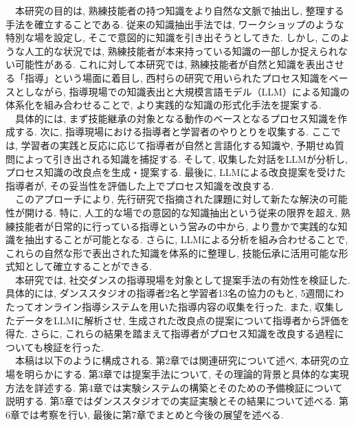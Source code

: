 　本研究の目的は, 熟練技能者の持つ知識をより自然な文脈で抽出し, 整理する手法を確立することである. 従来の知識抽出手法では, ワークショップのような特別な場を設定し, そこで意図的に知識を引き出そうとしてきた. しかし, このような人工的な状況では, 熟練技能者が本来持っている知識の一部しか捉えられない可能性がある. これに対して本研究では, 熟練技能者が自然と知識を表出させる「指導」という場面に着目し, 西村らの研究\cite{Nishimura2017}で用いられたプロセス知識をベースとしながら, 指導現場での知識表出と大規模言語モデル（LLM）による知識の体系化を組み合わせることで, より実践的な知識の形式化手法を提案する. \\
　具体的には, まず技能継承の対象となる動作のベースとなるプロセス知識を作成する. 次に, 指導現場における指導者と学習者のやりとりを収集する. ここでは, 学習者の実践と反応に応じて指導者が自然と言語化する知識や, 予期せぬ質問によって引き出される知識を捕捉する. そして, 収集した対話をLLMが分析し, プロセス知識の改良点を生成・提案する. 最後に, LLMによる改良提案を受けた指導者が, その妥当性を評価した上でプロセス知識を改良する. \\
　このアプローチにより, 先行研究で指摘された課題に対して新たな解決の可能性が開ける. 特に, 人工的な場での意図的な知識抽出という従来の限界を超え, 熟練技能者が日常的に行っている指導という営みの中から, より豊かで実践的な知識を抽出することが可能となる. さらに, LLMによる分析を組み合わせることで, これらの自然な形で表出された知識を体系的に整理し, 技能伝承に活用可能な形式知として確立することができる. \\
　本研究では, 社交ダンスの指導現場を対象として提案手法の有効性を検証した. 具体的には, ダンススタジオの指導者2名と学習者13名の協力のもと, 5週間にわたってオンライン指導システムを用いた指導内容の収集を行った. また, 収集したデータをLLMに解析させ, 生成された改良点の提案について指導者から評価を得た. さらに, これらの結果を踏まえて指導者がプロセス知識を改良する過程についても検証を行った.\\
　本稿は以下のように構成される. 第2章では関連研究について述べ, 本研究の立場を明らかにする. 第3章では提案手法について, その理論的背景と具体的な実現方法を詳述する. 第4章では実験システムの構築とそのための予備検証について説明する. 第5章ではダンススタジオでの実証実験とその結果について述べる. 第6章では考察を行い, 最後に第7章でまとめと今後の展望を述べる.\\


